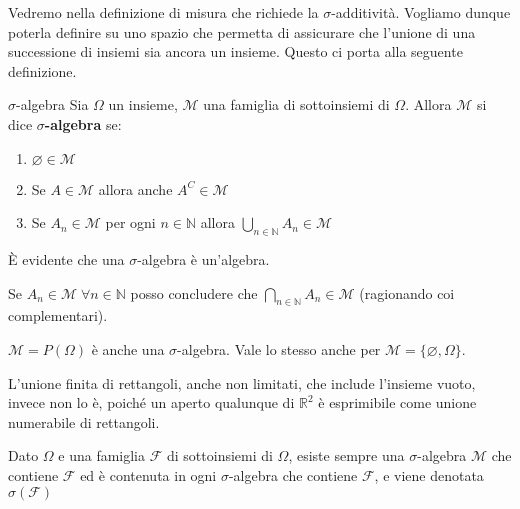 Vedremo nella definizione di misura che richiede la \(\sigma\)-additività.
Vogliamo dunque poterla definire su uno spazio che permetta di assicurare che
l'unione di una successione di insiemi sia ancora un insieme. Questo ci porta
alla seguente definizione.

\begin{definition}{\(\sigma\)-algebra}
    Sia \(\Omega\) un insieme, \(\mathcal{M}\) una famiglia di sottoinsiemi di
    \(\Omega\). Allora \(\mathcal{M}\) si dice \textbf{\(\sigma\)-algebra} se:
\begin{enumerate}[label = \arabic*.]
    \item \(\varnothing \in \mathcal{M}\) 
    \item Se \(A \in \mathcal{M}\) allora anche \(A^{C}\in \mathcal{M}\) 
    \item Se \(A_{n} \in \mathcal{M}\) per ogni \(n \in \mathbb{N}\) allora
        \(\bigcup_{n \in \mathbb{N}} A_{n} \in \mathcal{M}\) 
\end{enumerate}
\end{definition}
\begin{remark}
    È evidente che una \(\sigma\)-algebra è un'algebra.
\end{remark}
\begin{remark}
    Se \(A_{n} \in \mathcal{M} \; \forall n \in \mathbb{N}\) posso concludere che
    \(\bigcap_{n \in \mathbb{N}} A_{n} \in \mathcal{M} \) (ragionando coi complementari).
\end{remark}

\begin{example}
    \(\mathcal{M} = P(\Omega)\) è anche una \(\sigma\)-algebra. Vale lo stesso
    anche per \(\mathcal{M} = \{\varnothing, \Omega\} \).
\end{example}
\begin{example}
    L'unione finita di rettangoli, anche non limitati, che include l'insieme
    vuoto, invece non lo è, poiché un aperto qualunque di \(\mathbb{R}^{2}\) è
    esprimibile come unione numerabile di rettangoli.
\end{example}

\newpage
\begin{theorem}

Dato \(\Omega\) e una famiglia \(\mathcal{F}\) di sottoinsiemi di \(\Omega\),
esiste sempre una \(\sigma\)-algebra \(\mathcal{M}\) che contiene
\(\mathcal{F}\) ed è contenuta in ogni \(\sigma\)-algebra che contiene
\(\mathcal{F}\), e viene denotata \(\sigma(\mathcal{F})\)

\end{theorem}


